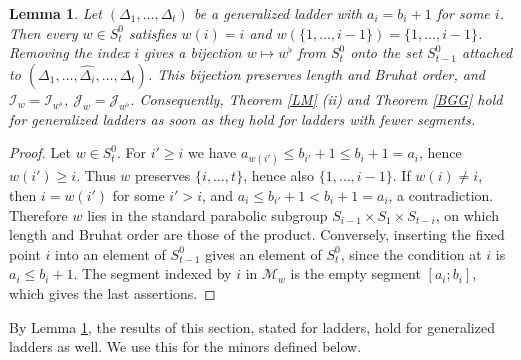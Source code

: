 \documentclass[a4paper,12pt,leqno]{amsart}
\newcommand{\caI}{\mathcal{I}}
\newcommand{\caJ}{\mathcal{J}}
\newcommand{\caM}{\mathcal{M}}
\theoremstyle{plain}
\newtheorem{lemma}[thm]{Lemma}
\theoremstyle{definition}
\theoremstyle{definition}
\begin{document}
\begin{lemma}\label{lem:empty} Let $(\Delta_1,\ldots,\Delta_t)$ be a generalized ladder with $a_i=b_i+1$
 for some $i$. Then every $w\in S_t^0$ satisfies $w(i)=i$ and $w(\{1,\ldots,i-1\})=\{1,\ldots,i-1\}$.
 Removing the index $i$ gives a bijection $w\mapsto w^\flat$ from $S_t^0$ onto the set $S^0_{t-1}$
 attached to $(\Delta_1,\ldots,\widehat{\Delta_i},\ldots,\Delta_t)$. This bijection preserves
 length and Bruhat order,
 and $\caI_w=\caI_{w^\flat}$, $\caJ_w=\caJ_{w^\flat}$. Consequently, Theorem \ref{LM} (ii) and
 Theorem \ref{BGG} hold for generalized ladders as soon as they hold for ladders with fewer segments.
\end{lemma}

\begin{proof}
Let $w\in S_t^0$. For $i'\geq i$ we have $a_{w(i')}\leq b_{i'}+1\leq b_i+1=a_i$, hence $w(i')\geq i$.
Thus $w$ preserves $\{i,\ldots,t\}$, hence also $\{1,\ldots,i-1\}$. If $w(i)\neq i$, then $i=w(i')$
for some $i'>i$,
and $a_i\leq b_{i'}+1<b_i+1=a_i$, a contradiction. Therefore $w$ lies in the standard parabolic subgroup
$S_{i-1}\times S_1\times S_{t-i}$, on which length and Bruhat order are those of the product. Conversely,
inserting the fixed point $i$ into an element of $S^0_{t-1}$ gives an element of $S^0_t$, since the condition
 at $i$ is $a_i\leq b_i+1$. The segment indexed by $i$ in $\caM_w$ is the empty segment $[a_i;b_i]$,
 which gives the last assertions.
\end{proof}

By Lemma \ref{lem:empty}, the results of this section, stated for ladders, hold for generalized
ladders as well. We use this for the minors defined below.
\end{document}
